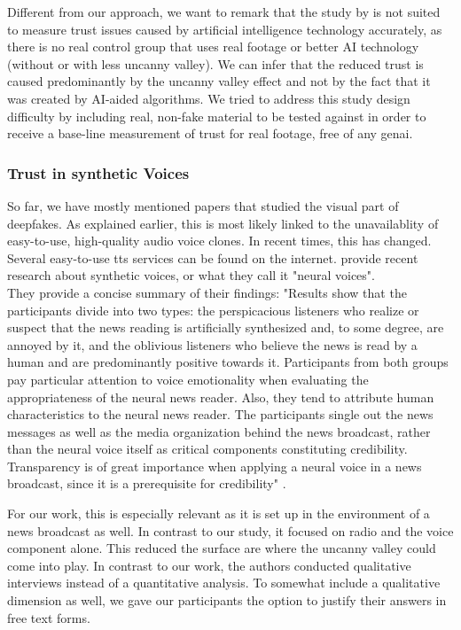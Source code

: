 \documentclass[
  a4paper,  %
  twoside,  %
  bibliography=totoc,
  headsepline,
  cleardoublepage=empty,
  parskip=half,
  draft=false
]{scrbook}
\begin{document}
Different from our approach, we want to remark that the study by  is not suited to measure trust issues caused by artificial intelligence technology accurately, as there is no real control group that uses real footage or better AI technology (without or with less uncanny valley). We can infer that the reduced trust is caused predominantly by the uncanny valley effect and not by the fact that it was created by AI-aided algorithms. We tried to address this study design difficulty by including real, non-fake material to be tested against in order to receive a base-line measurement of trust for real footage, free of any \gls{genai}.

\subsubsection*{Trust in synthetic Voices}
So far, we have mostly mentioned papers that studied the visual part of deepfakes. As explained earlier, this is most likely linked to the unavailablity of easy-to-use, high-quality audio voice clones. In recent times, this has changed. Several easy-to-use \gls{tts} services can be found on the internet.  provide recent research about synthetic voices, or what they call it "neural voices". \\
They provide a concise summary of their findings: "Results show that the participants divide into two types: the perspicacious listeners who realize or suspect that the news reading is artificially synthesized and, to some degree, are annoyed by it, and the oblivious listeners who believe the news is read by a human and are predominantly positive towards it. Participants from both groups pay particular attention to voice emotionality when evaluating the appropriateness of the neural news reader. Also, they tend to attribute human characteristics to the neural news reader. The participants single out the news messages as well as the media organization behind the news broadcast, rather than the neural voice itself as critical components constituting credibility. Transparency is of great importance when applying a neural voice in a news broadcast, since it is a prerequisite for credibility" \cite{heiselbergAutomatedNewsReading2022}.

For our work, this is especially relevant as it is set up in the environment of a news broadcast as well. In contrast to our study, it focused on radio and the voice component alone. This reduced the surface are where the uncanny valley could come into play. In contrast to our work, the authors conducted qualitative interviews instead of a quantitative analysis. To somewhat include a qualitative dimension as well, we gave our participants the option to justify their answers in free text forms. 
\end{document}
